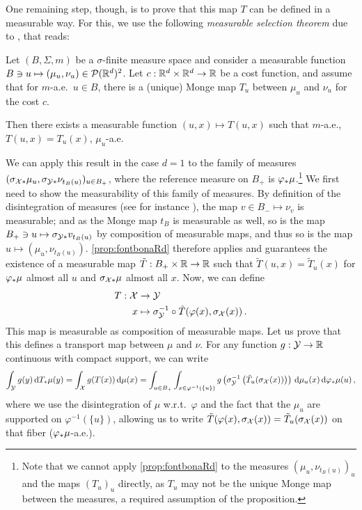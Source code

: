 One remaining step, though, is to prove that this map $T$ can be defined in a measurable way.
For this, we use the following \emph{measurable selection theorem} due to \cite[Thm.~1.1]{fontbona2010measurability}, that reads:
\begin{proposition}\label{prop:fontbonaRd}
    Let $(B,\Sigma,m)$ be a $\sigma$-finite measure space and consider a measurable function
    $B \ni u \mapsto (\mu_u,\nu_u) \in \mathcal{P}(\mathbb{R}^d)^2$.
    Let $c : \mathbb{R}^d \times \mathbb{R}^d \to \mathbb{R}$ be a cost function, and
    assume that for $m$-a.e.~$u \in B$,
    there is a (unique) Monge map  $T_u$ between $\mu_u$ and $\nu_u$ for the cost $c$.

    \noindent Then there exists a measurable function $(u,x) \mapsto T(u,x)$ such that $m$-a.e., $T(u,x) = T_u(x)$, $\mu_u$-a.e.
\end{proposition}

We can apply this result in the case $d=1$ to the family of measures $(\sigma_{\mathcal{X}*} \mu_u, \sigma_{\mathcal{Y}*} \nu_{t_B(u)})_{u \in B_+}$, where the reference measure on $B_+$ is $\varphi_*\mu$.\footnote{Note that we cannot apply \cref{prop:fontbonaRd} to the measures $(\mu_u,\nu_{t_B(u)})_u$ and the maps $(T_u)_u$ directly, as $T_u$ may not be the unique Monge map between the measures, a required assumption of the proposition.}
We first need to show the measurability of this family of measures.
By definition of the disintegration of measures (see for instance \cite[Thm.~5.3.1]{ambrosio2005gradient}), the map $v \in B_- \mapsto \nu_{v}$ is measurable; and as the Monge map $t_B$ is measurable as well, so is the map $B_+ \ni u \mapsto \sigma_{\mathcal{Y}*} v_{t_B(u)}$ by composition of measurable maps, and thus so is the map $u \mapsto (\mu_u, \nu_{t_B(u)})$.
\cref{prop:fontbonaRd} therefore applies and guarantees the existence of a measurable map $\tilde{T} : B_+ \times \mathbb{R} \to \mathbb{R}$ such that $\tilde{T}(u,x) = \tilde{T}_u(x)$ for $\varphi_*\mu$ almost all $u$ and $\sigma_{\mathcal{X}*}\mu$ almost all $x$. Now, we can define
\begin{align*}
    T : \mathcal{X} &\to \mathcal{Y} \\
         x &\mapsto \sigma_{\mathcal{Y}}^{-1} \circ \tilde{T}(\varphi(x), \sigma_{\mathcal{X}}(x))\,.
\end{align*}
This map is measurable as composition of measurable maps.
Let us prove that this defines a transport map between $\mu$ and $\nu$.
For any function $g : \mathcal{Y} \to \mathbb{R}$ continuous with compact support, we can write
\begin{equation*}
    \int_{\mathcal{Y}} g(y) \,\mathrm d T_*\mu(y) = \int_{\mathcal{X}} g(T(x)) \,\mathrm d \mu(x)
    = \int_{u \in B_+} \int_{x \in \varphi^{-1}(\{u\})} g\left(\sigma_{\mathcal{Y}}^{-1}\left(\tilde{T}_u(\sigma_{\mathcal{X}}(x))\right)\right) \,\mathrm d \mu_u(x) \,\mathrm d \varphi _* \mu(u)\,,
\end{equation*}
where we use the disintegration of $\mu$ w.r.t.~$\varphi$ and the fact that the $\mu_u$ are supported on $\varphi^{-1}(\{u\})$, allowing us to write $\tilde{T}(\varphi(x),\sigma_{\mathcal{X}}(x)) = \tilde{T}_u(\sigma_{\mathcal{X}}(x))$ on that fiber ($\varphi_*\mu$-a.e.).

